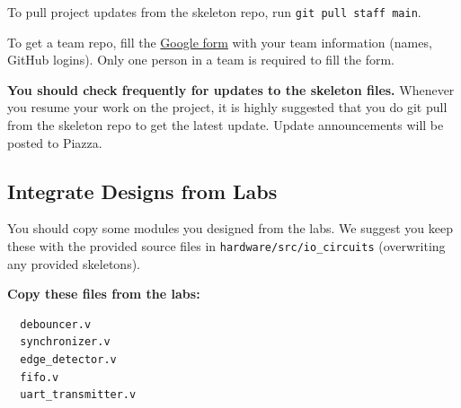 \documentclass[11pt]{article}
\begin{document}
To pull project updates from the skeleton repo, run \verb|git pull staff main|.

To get a team repo, fill the \href{https://forms.gle/7s9dDKWdLRchwKKd9}{Google form} with your team information (names, GitHub logins). Only one person in a team is required to fill the form.

\textbf{You should check frequently for updates to the skeleton files.} Whenever you resume your work on the project,
it is highly suggested that you do git pull from the skeleton repo to get the latest update.
Update announcements will be posted to Piazza.

\subsection{Integrate Designs from Labs} \label{sec:past_designs}
You should copy some modules you designed from the labs.
We suggest you keep these with the provided source files in \verb|hardware/src/io_circuits| (overwriting any provided skeletons).

\textbf{Copy these files from the labs:}
\begin{verbatim}
  debouncer.v
  synchronizer.v
  edge_detector.v
  fifo.v
  uart_transmitter.v
\end{verbatim}
\end{document}
